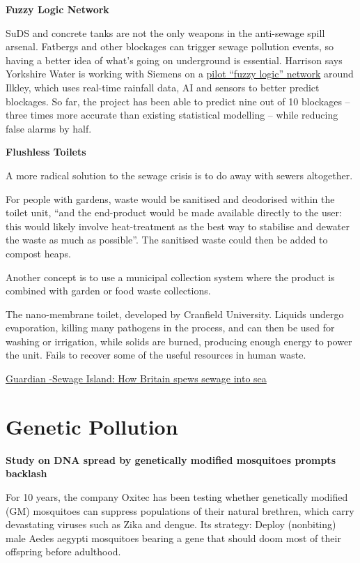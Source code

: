 \documentclass[
]{book}
\begin{document}
\textbf{Fuzzy Logic Network}

SuDS and concrete tanks are not the only weapons in the anti-sewage spill arsenal. Fatbergs and other blockages can trigger sewage pollution events, so having a better idea of what's going on underground is essential. Harrison says Yorkshire Water is working with Siemens on a \href{https://www.waterindustryjournal.co.uk/fuzzy-logic-clear-up-blockage-prediction-for-yorkshire-water}{pilot ``fuzzy logic'' network} around Ilkley, which uses real-time rainfall data, AI and sensors to better predict blockages. So far, the project has been able to predict nine out of 10 blockages -- three times more accurate than existing statistical modelling -- while reducing false alarms by half.

\textbf{Flushless Toilets}

A more radical solution to the sewage crisis is to do away with sewers altogether.

For people with gardens, waste would be sanitised and deodorised within the toilet unit, ``and the end-product would be made available directly to the user: this would likely involve heat-treatment as the best way to stabilise and dewater the waste as much as possible''. The sanitised waste could then be added to compost heaps.

Another concept is to use a municipal collection system where the product is combined with garden or food waste collections.

The nano-membrane toilet, developed by Cranfield University. Liquids undergo evaporation, killing many pathogens in the process, and can then be used for washing or irrigation, while solids are burned, producing enough energy to power the unit.
Fails to recover some of the useful resources in human waste.

\href{https://www.theguardian.com/environment/2021/apr/19/sewage-island-how-britain-spews-untreated-waste-rivers-sea}{Guardian -Sewage Island: How Britain spews sewage into sea}

\hypertarget{genetic-pollution}{%
\section{Genetic Pollution}\label{genetic-pollution}}

\textbf{Study on DNA spread by genetically modified mosquitoes prompts backlash}

For 10 years, the company Oxitec has been testing whether genetically modified (GM) mosquitoes can suppress populations of their natural brethren, which carry devastating viruses such as Zika and dengue. Its strategy: Deploy (nonbiting) male Aedes aegypti mosquitoes bearing a gene that should doom most of their offspring before adulthood.
\end{document}
